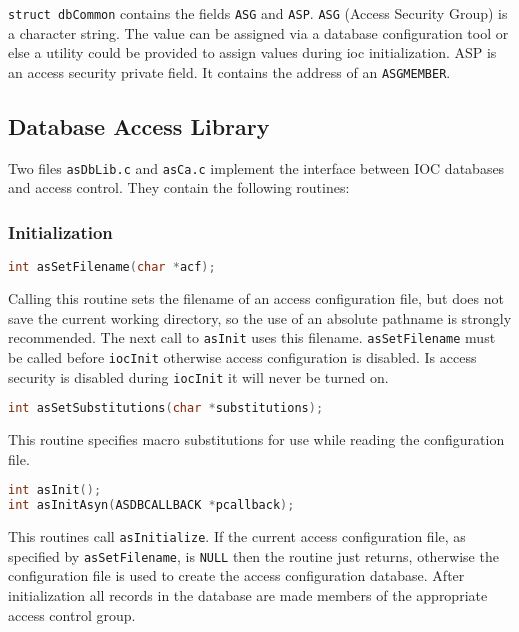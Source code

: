 \verb|struct dbCommon| contains the fields \verb|ASG| and \verb|ASP|.
\verb|ASG| (Access Security Group) is a character string.
The value can be assigned via a database configuration tool or else a utility could be provided to assign values during ioc initialization.
ASP is an access security private field.
It contains the address of an \verb|ASGMEMBER|.

\subsection{Database Access Library}

Two files \verb|asDbLib.c| and \verb|asCa.c| implement the interface between IOC databases and access control.
They contain the following routines:

\subsubsection{Initialization}

\begin{lstlisting}[language=C]
int asSetFilename(char *acf);
\end{lstlisting}

Calling this routine sets the filename of an access configuration file, but does not save the current working directory, so the use of an absolute pathname is strongly recommended.
The next call to \verb|asInit| uses this filename.
\verb|asSetFilename| must be called before \verb|iocInit| otherwise access configuration is disabled.
Is access security is disabled during \verb|iocInit| it will never be turned on.

\begin{lstlisting}[language=C]
int asSetSubstitutions(char *substitutions);
\end{lstlisting}

This routine specifies macro substitutions for use while reading the configuration file.

\begin{lstlisting}[language=C]
int asInit();
int asInitAsyn(ASDBCALLBACK *pcallback);
\end{lstlisting}

This routines call \verb|asInitialize|.
If the current access configuration file, as specified by \verb|asSetFilename|, is \verb|NULL| then the routine just returns, otherwise the configuration file is used to create the access configuration database.
After initialization all records in the database are made members of the appropriate access control group.

